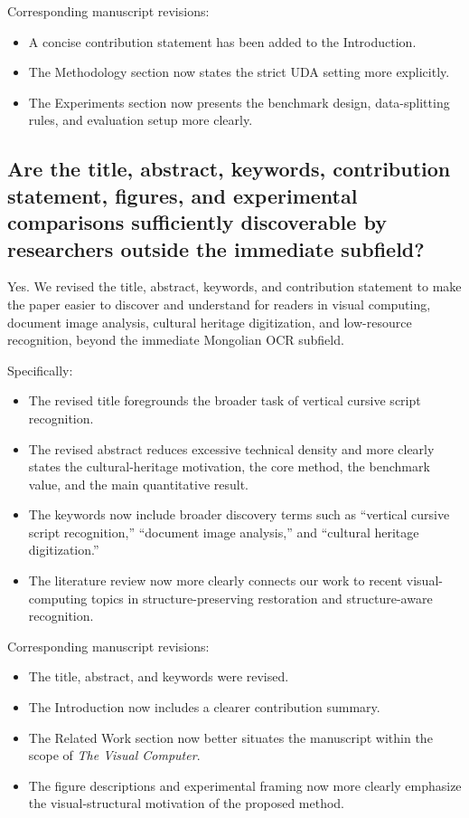 \documentclass[11pt]{article}
\begin{document}
Corresponding manuscript revisions:
\begin{itemize}[leftmargin=1.5em]
\item A concise contribution statement has been added to the Introduction.
\item The Methodology section now states the strict UDA setting more explicitly.
\item The Experiments section now presents the benchmark design, data-splitting rules, and evaluation setup more clearly.
\end{itemize}

\subsection{Are the title, abstract, keywords, contribution statement, figures, and experimental comparisons sufficiently discoverable by researchers outside the immediate subfield?}

Yes. We revised the title, abstract, keywords, and contribution statement to make the paper easier to discover and understand for readers in visual computing, document image analysis, cultural heritage digitization, and low-resource recognition, beyond the immediate Mongolian OCR subfield.

Specifically:
\begin{itemize}[leftmargin=1.5em]
\item The revised title foregrounds the broader task of vertical cursive script recognition.
\item The revised abstract reduces excessive technical density and more clearly states the cultural-heritage motivation, the core method, the benchmark value, and the main quantitative result.
\item The keywords now include broader discovery terms such as ``vertical cursive script recognition,'' ``document image analysis,'' and ``cultural heritage digitization.''
\item The literature review now more clearly connects our work to recent visual-computing topics in structure-preserving restoration and structure-aware recognition.
\end{itemize}

Corresponding manuscript revisions:
\begin{itemize}[leftmargin=1.5em]
\item The title, abstract, and keywords were revised.
\item The Introduction now includes a clearer contribution summary.
\item The Related Work section now better situates the manuscript within the scope of \textit{The Visual Computer}.
\item The figure descriptions and experimental framing now more clearly emphasize the visual-structural motivation of the proposed method.
\end{itemize}
\end{document}
